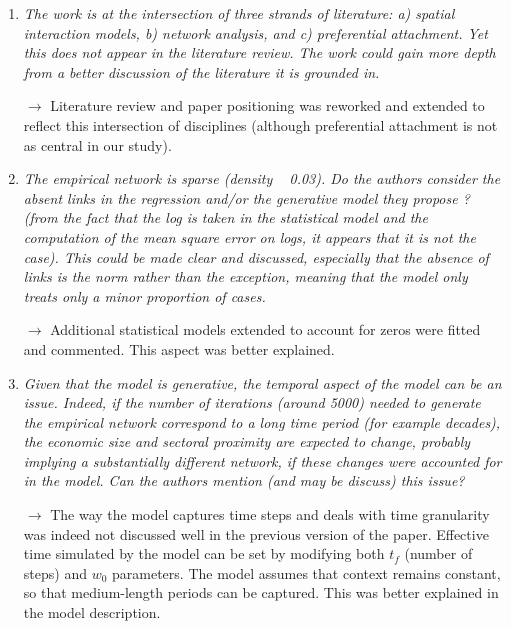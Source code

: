 \documentclass[10pt,a4paper,sans]{moderncv}
\begin{document}

\begin{enumerate}

	\item \textit{The work is at the intersection of three strands of literature: a) spatial interaction models, b) network analysis, and c) preferential attachment. Yet this does not appear in the literature review. The work could gain more depth from a better discussion of the literature it is grounded in.}
	
	$\rightarrow$ Literature review and paper positioning was reworked and extended to reflect this intersection of disciplines (although preferential attachment is not as central in our study).
	
	\medskip


	\item \textit{The empirical network is sparse (density ~ 0.03). Do the authors consider the absent links in the regression and/or the generative model they propose ? (from the fact that the log is taken in the statistical model and the computation of the mean square error on logs, it appears that it is not the case). This could be made clear and discussed, especially that the absence of links is the norm rather than the exception, meaning that the model only treats only a minor proportion of cases.}
	
	$\rightarrow$ Additional statistical models extended to account for zeros were fitted and commented. This aspect was better explained.
	
	\medskip


	\item \textit{Given that the model is generative, the temporal aspect of the model can be an issue. Indeed, if the number of iterations (around 5000) needed to generate the empirical network correspond to a long time period (for example decades), the economic size and sectoral proximity are expected to change, probably implying a substantially different network, if these changes were accounted for in the model. Can the authors mention (and may be discuss) this issue?}
	
	$\rightarrow$ The way the model captures time steps and deals with time granularity was indeed not discussed well in the previous version of the paper. Effective time simulated by the model can be set by modifying both $t_f$ (number of steps) and $w_0$ parameters. The model assumes that context remains constant, so that medium-length periods can be captured. This was better explained in the model description.


\end{enumerate}
\end{document}
